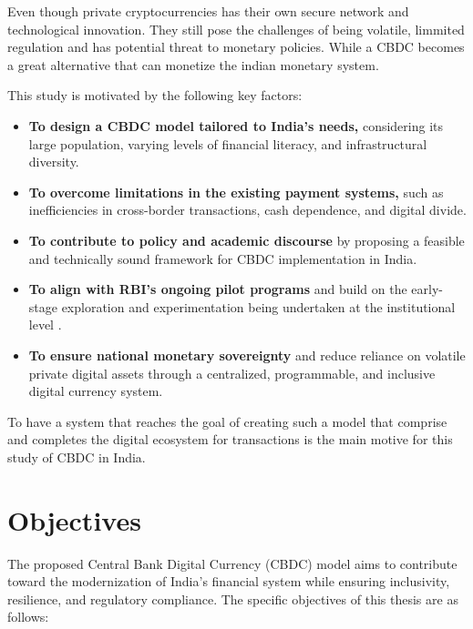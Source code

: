 Even though private cryptocurrencies has their own secure network and technological innovation. They still pose the challenges of being volatile, limmited regulation and has potential threat to monetary policies.
While a CBDC becomes a great alternative that can monetize the indian monetary system.

This study is motivated by the following key factors:

\begin{itemize}
    \item \textbf{To design a CBDC model tailored to India's needs,} considering its large population, varying levels of financial literacy, and infrastructural diversity.

    \item \textbf{To overcome limitations in the existing payment systems,} such as inefficiencies in cross-border transactions, cash dependence, and digital divide.

    \item \textbf{To contribute to policy and academic discourse} by proposing a feasible and technically sound framework for CBDC implementation in India.

    \item \textbf{To align with RBI’s ongoing pilot programs} and build on the early-stage exploration and experimentation being undertaken at the institutional level \cite{menon2022}.

    \item \textbf{To ensure national monetary sovereignty} and reduce reliance on volatile private digital assets through a centralized, programmable, and inclusive digital currency system.
\end{itemize}

To have a system that reaches the goal of creating such a model that comprise and completes the digital ecosystem for transactions is the main motive for this study of CBDC in India.


\section{Objectives}

The proposed Central Bank Digital Currency (CBDC) model aims to contribute toward the modernization of India’s financial system while ensuring inclusivity, resilience, and regulatory compliance. The specific objectives of this thesis are as follows:

